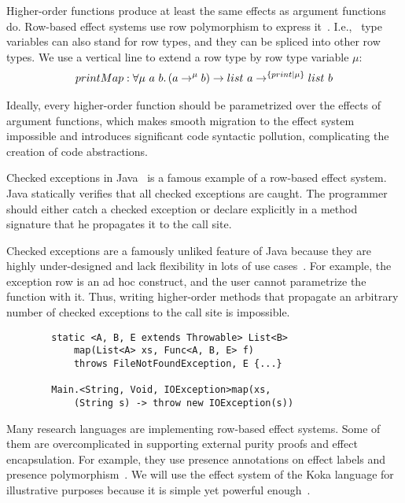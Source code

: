 \documentclass[conference]{IEEEtran}
\newcommand{\ap}{~}
\begin{document}
    Higher-order functions produce at least the same effects as argument functions do.
    Row-based effect systems use row polymorphism to express it~\cite{gaster1996polymorphic}.
    I.e., \ type variables can also stand for row types, and they can be spliced into other row types.
    We use a vertical line to extend a row type by row type variable $\mu$:
    \begin{multline*}
        printMap : \forall \mu \ap a \ap b\ldotp (a \to^\mu b) \to list \ap a \to^{\{print|\mu\}} list \ap b
    \end{multline*}

    Ideally, every higher-order function should be parametrized over the effects of argument functions, which makes smooth migration to the effect system impossible and introduces significant code syntactic pollution, complicating the creation of code abstractions.


    Checked exceptions in Java~\cite{gosling2000java} is a famous example of a row-based effect system.
    Java statically verifies that all checked exceptions are caught.
    The programmer should either catch a checked exception or declare explicitly in a method signature that he propagates it to the call site.

    Checked exceptions are a famously unliked feature of Java because they are highly under-designed and lack flexibility in lots of use cases~\cite{checked-exceptions}.
    For example, the exception row is an ad hoc construct, and the user cannot parametrize the function with it.
    Thus, writing higher-order methods that propagate an arbitrary number of checked exceptions to the call site is impossible.

    \begin{verbatim}
        static <A, B, E extends Throwable> List<B>
            map(List<A> xs, Func<A, B, E> f)
            throws FileNotFoundException, E {...}

        Main.<String, Void, IOException>map(xs,
            (String s) -> throw new IOException(s))
    \end{verbatim}


    Many research languages are implementing row-based effect systems.
    Some of them are overcomplicated in supporting external purity proofs and effect encapsulation.
    For example, they use presence annotations on effect labels and presence polymorphism~\cite{hillerstrom2016liberating}.
    We will use the effect system of the Koka language for illustrative purposes because it is simple yet powerful enough~\cite{leijen2014koka, leijen2017type}.
\end{document}
